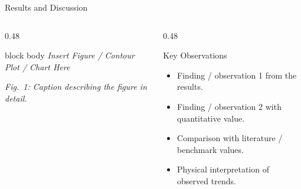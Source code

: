 \documentclass[aspectratio=169, 10pt]{beamer}
\begin{document}
\begin{frame}{Results and Discussion}
  \begin{columns}[T]
    \begin{column}{0.48\textwidth}
      \begin{beamercolorbox}[wd=\textwidth, rounded=true, sep=5pt,
            center]{block body}
        \vspace{1.8cm}
        \textit{\small Insert Figure / Contour Plot / Chart Here}
        \vspace{1.8cm}
      \end{beamercolorbox}
      \vspace{0.3em}
      {\footnotesize\textit{Fig.~1: Caption describing the figure in detail.}}
    \end{column}
    \begin{column}{0.48\textwidth}
      \begin{block}{\textcolor{MLIOTwhite}{Key Observations}}
        \begin{itemize}
          \item Finding / observation 1 from the results.
          \item Finding / observation 2 with quantitative value.
          \item Comparison with literature / benchmark values.
          \item Physical interpretation of observed trends.
        \end{itemize}
      \end{block}
    \end{column}
  \end{columns}
\end{frame}
\end{document}
